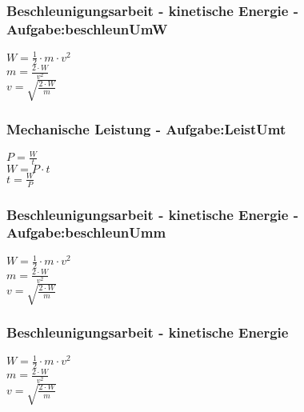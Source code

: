 \subsubsection{Beschleunigungsarbeit - kinetische Energie - Aufgabe:beschleunUmW} 
\begin{minipage}{0.45\textwidth} 
$ W = \frac{1}{2}\cdot m\cdot v^{2} $\\ 
$ m = \frac{2\cdot W}{ v^{2} } $\\ 
$ v = \sqrt{\frac{2\cdot W}{ m}} $\\ 
\end{minipage} 
\begin{minipage}{0.45\textwidth} 
 
\end{minipage} 
\subsubsection{Mechanische Leistung - Aufgabe:LeistUmt} 
\begin{minipage}{0.45\textwidth} 
$ P = \frac{W}{t} $\\ 
$ W = P\cdot t $\\ 
$ t = \frac{W}{P} $\\ 
\end{minipage} 
\begin{minipage}{0.45\textwidth} 
 
\end{minipage} 
\subsubsection{Beschleunigungsarbeit - kinetische Energie - Aufgabe:beschleunUmm} 
\begin{minipage}{0.45\textwidth} 
$ W = \frac{1}{2}\cdot m\cdot v^{2} $\\ 
$ m = \frac{2\cdot W}{ v^{2} } $\\ 
$ v = \sqrt{\frac{2\cdot W}{ m}} $\\ 
\end{minipage} 
\begin{minipage}{0.45\textwidth} 
 
\end{minipage} 
\subsubsection{Beschleunigungsarbeit - kinetische Energie} 
\begin{minipage}{0.45\textwidth} 
$ W = \frac{1}{2}\cdot m\cdot v^{2} $\\ 
$ m = \frac{2\cdot W}{ v^{2} } $\\ 
$ v = \sqrt{\frac{2\cdot W}{ m}} $\\ 
\end{minipage} 
\begin{minipage}{0.45\textwidth} 
 
\end{minipage} 
